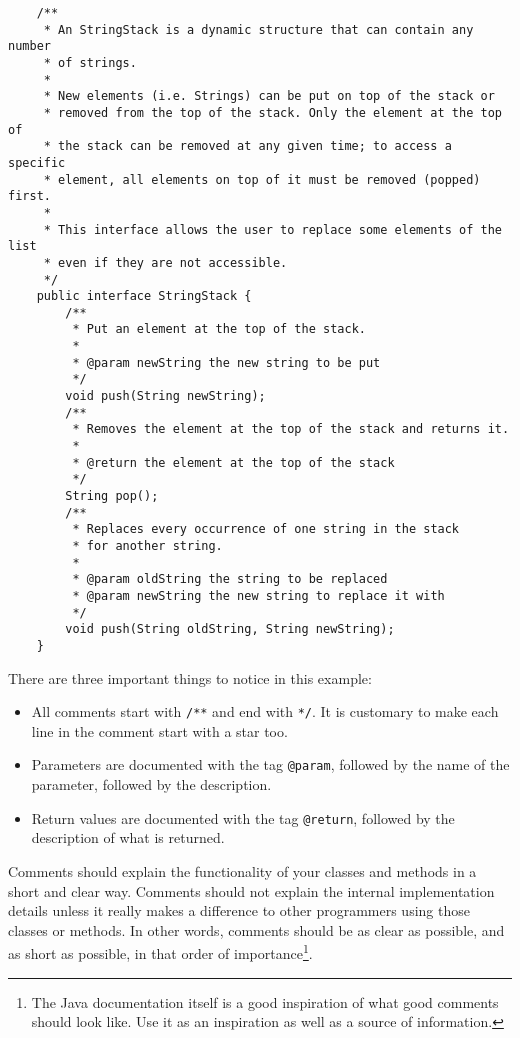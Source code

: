 \begin{verbatim}
    /**
     * An StringStack is a dynamic structure that can contain any number
     * of strings. 
     * 
     * New elements (i.e. Strings) can be put on top of the stack or
     * removed from the top of the stack. Only the element at the top of
     * the stack can be removed at any given time; to access a specific 
     * element, all elements on top of it must be removed (popped) first. 
     * 
     * This interface allows the user to replace some elements of the list
     * even if they are not accessible. 
     */
    public interface StringStack {
        /**
         * Put an element at the top of the stack. 
         *
         * @param newString the new string to be put
         */
        void push(String newString);
        /**
         * Removes the element at the top of the stack and returns it. 
         *
         * @return the element at the top of the stack
         */
        String pop();
        /**
         * Replaces every occurrence of one string in the stack
         * for another string. 
         *
         * @param oldString the string to be replaced
         * @param newString the new string to replace it with
         */
        void push(String oldString, String newString);
    }
\end{verbatim}

There are three important things to notice in this example: 

\begin{itemize}
\item All comments start with \verb+/**+ and end with \verb+*/+. It is
  customary to make each line in the comment start with a star too.
\item Parameters are documented with the tag \verb+@param+, followed
  by the name of the parameter, followed by the description.
\item Return values are documented with the tag \verb+@return+,
  followed by the description of what is returned. 
\end{itemize}

Comments should explain the functionality of your classes and methods
in a short and clear way. Comments should not explain the internal
implementation details unless it really makes a difference to other
programmers using those classes or methods. In other words, comments
should be as clear as possible, and as short as possible, in that
order of importance\footnote{The Java documentation itself is a good
  inspiration of what good comments should look like. Use it as an
  inspiration as well as a source of information.}. 

